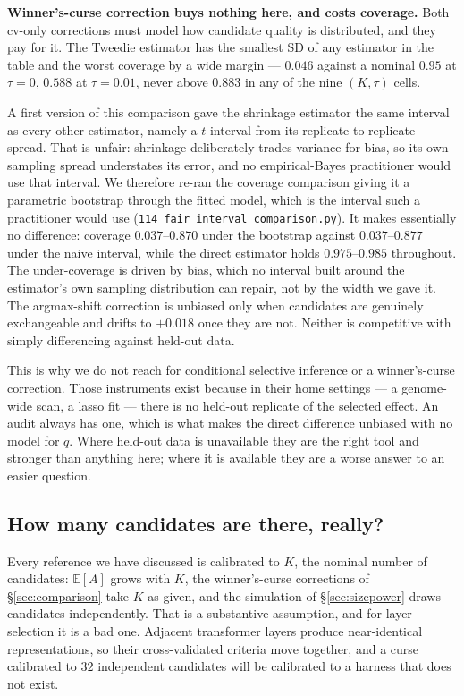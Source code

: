 \documentclass{article}
\begin{document}
\textbf{Winner's-curse correction buys nothing here, and costs coverage.}
Both cv-only corrections must model how candidate quality is distributed,
and they pay for it. The Tweedie estimator has the smallest SD of any
estimator in the table and the worst coverage by a wide margin --- $0.046$
against a nominal $0.95$ at $\tau=0$, $0.588$ at $\tau=0.01$, never above
$0.883$ in any of the nine $(K,\tau)$ cells.

A first version of this comparison gave the shrinkage estimator the same
interval as every other estimator, namely a $t$ interval from its
replicate-to-replicate spread. That is unfair: shrinkage deliberately trades
variance for bias, so its own sampling spread understates its error, and no
empirical-Bayes practitioner would use that interval. We therefore re-ran the
coverage comparison giving it a parametric bootstrap through the fitted
model, which is the interval such a practitioner would use
(\texttt{114\_fair\_interval\_comparison.py}). It makes essentially no
difference: coverage $0.037$--$0.870$ under the bootstrap against
$0.037$--$0.877$ under the naive interval, while the direct estimator holds
$0.975$--$0.985$ throughout. The under-coverage is driven by bias, which no
interval built around the estimator's own sampling distribution can repair,
not by the width we gave it. The
argmax-shift correction is unbiased only when candidates are genuinely
exchangeable and drifts to $+0.018$ once they are not. Neither is competitive
with simply differencing against held-out data.

This is why we do not reach for conditional selective inference or a
winner's-curse correction. Those instruments exist because in their home
settings --- a genome-wide scan, a lasso fit --- there is no held-out
replicate of the selected effect. An audit always has one, which is what makes
the direct difference unbiased with no model for $q$. Where held-out data is
unavailable they are the right tool and stronger than anything here; where it
is available they are a worse answer to an easier question.

\subsection{How many candidates are there, really?}
\label{sec:effectivek}

Every reference we have discussed is calibrated to $K$, the nominal number of
candidates: $\mathbb{E}[A]$ grows with $K$, the winner's-curse corrections of
\S\ref{sec:comparison} take $K$ as given, and the simulation of
\S\ref{sec:sizepower} draws candidates independently. That is a substantive
assumption, and for layer selection it is a bad one. Adjacent transformer
layers produce near-identical representations, so their cross-validated
criteria move together, and a curse calibrated to $32$ independent candidates
will be calibrated to a harness that does not exist.
\end{document}
